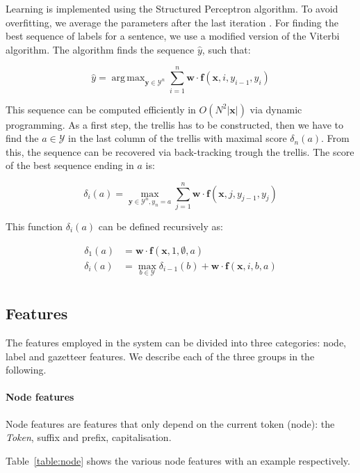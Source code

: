 \documentclass[11pt]{article}
\DeclareMathOperator*{\argmax}{arg\,max}
\begin{document}
Learning is implemented using the Structured Perceptron algorithm. To avoid overfitting, we average the parameters after the last iteration \cite{collins2002discriminative}. 
For finding the best sequence of labels for a sentence, we use a modified version of the Viterbi algorithm. The algorithm finds the sequence $\hat{y}$, such that:

\[
\hat{y} = \argmax_{\mathbf{y} \in \mathcal{Y}^{n}} \sum_{i=1}^{n}\mathbf{w} \cdot \boldsymbol{f}(\mathbf{x}, i, y_{i-1}, y_{i})
\]

This sequence can be computed efficiently in $ O( N^2 |\mathbf{x}| ) $ via dynamic programming. 
As a first step, the trellis has to be constructed, then we have to find the $ a \in \mathcal{Y}$ in the 
last column of the trellis with maximal score $\delta_n(a)$. From this, the sequence can be recovered via back-tracking trough the trellis. 
The score of the best sequence ending in $a$ is:

\[
\delta_i(a) = \max_{\mathbf{y} \in \mathcal{Y}^{n}, y_n = a} \sum_{j=1}^{n}{\mathbf{w} \cdot \boldsymbol{f}(\mathbf{x}, j, y_{j-1}, y_{j})}
\]

\noindent This function $\delta_i(a)$ can be defined recursively as:

\begin{align*}
\delta_1(a) &= \mathbf{w} \cdot \boldsymbol{f}(\mathbf{x}, 1, \emptyset, a) \\
\delta_i(a) &= \max_{b \in \mathcal{Y}} \delta_{i-1}(b) + \mathbf{w} \cdot \boldsymbol{f}(\mathbf{x}, i, b, a) \\
\end{align*}


\subsection{Features}
The features employed in the system can be divided into three categories: node, label and gazetteer features. 
We describe each of the three groups in the following.

\paragraph*{Node features}
Node features are features that only depend on the current token (node): the \emph{Token}, suffix and prefix, capitalisation.

Table~\ref{table:node} shows the various node features with an example respectively.
\end{document}

